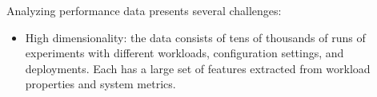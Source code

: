 Analyzing performance data presents several challenges:%
\begin{itemize}
\item High dimensionality: the data consists of tens of thousands of
  runs of experiments with different workloads, configuration
  settings, and deployments. Each has a large set of features
  extracted from workload properties and system metrics.


  

\end{itemize}
